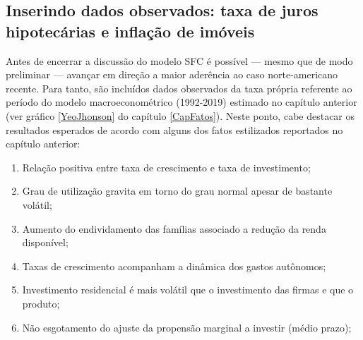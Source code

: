 \subsection*{Inserindo dados observados: taxa de juros hipotecárias e inflação de imóveis}

Antes de encerrar a discussão do modelo SFC é possível  --- mesmo que de modo preliminar --- avançar em direção a maior aderência ao caso norte-americano recente.
Para tanto, são incluídos dados observados da taxa própria  referente ao período do modelo macroeconométrico (1992-2019) estimado no capítulo anterior (ver gráfico \ref{YeoJhonson} do capítulo \ref{CapFatos}).
Neste ponto, cabe destacar os resultados esperados de acordo com 
alguns dos fatos estilizados reportados no capítulo anterior:

\begin{enumerate}
\item Relação positiva entre taxa de crescimento e taxa de investimento;
\item Grau de utilização gravita em torno do grau normal apesar de bastante volátil;
\item Aumento do endividamento das famílias associado a redução da renda disponível;
\item Taxas de crescimento acompanham a dinâmica dos gastos autônomos;
\item Investimento residencial é mais volátil que o investimento das firmas e que o produto;
\item Não esgotamento do ajuste da propensão marginal a investir (médio prazo);
\end{enumerate}


